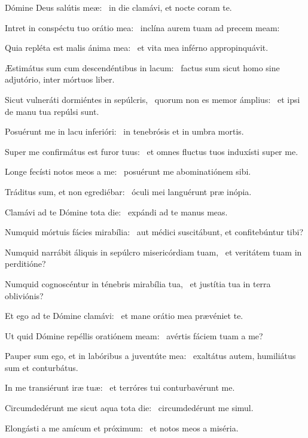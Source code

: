 \item Dómine Deus salútis meæ:~\psstar{} in die clamávi, et nocte coram te.

\item Intret in conspéctu tuo orátio mea:~\psstar{} inclína aurem tuam ad precem meam:

\item Quia repléta est malis ánima mea:~\psstar{} et vita mea inférno appropinquávit.

\item Æstimátus sum cum descendéntibus in lacum:~\psstar{} factus sum sicut homo sine adjutório, inter mórtuos liber.

\item Sicut vulneráti dormiéntes in sepúlcris,~\pscross{} quorum non es memor ámplius:~\psstar{} et ipsi de manu tua repúlsi sunt.

\item Posuérunt me in lacu inferióri:~\psstar{} in tenebrósis et in umbra mortis.

\item Super me confirmátus est furor tuus:~\psstar{} et omnes fluctus tuos induxísti super me.

\item Longe fecísti notos meos a me:~\psstar{} posuérunt me abominatiónem sibi.

\item Tráditus sum, et non egrediébar:~\psstar{} óculi mei languérunt præ inópia.

\item Clamávi ad te Dómine tota die:~\psstar{} expándi ad te manus meas.

\item Numquid mórtuis fácies mirabília:~\psstar{} aut médici suscitábunt, et confitebúntur tibi?

\item Numquid narrábit áliquis in sepúlcro misericórdiam tuam,~\psstar{} et veritátem tuam in perditióne?

\item Numquid cognoscéntur in ténebris mirabília tua,~\psstar{} et justítia tua in terra obliviónis?

\item Et ego ad te Dómine clamávi:~\psstar{} et mane orátio mea prævéniet te.

\item Ut quid Dómine repéllis oratiónem meam:~\psstar{} avértis fáciem tuam a me?

\item Pauper sum ego, et in labóribus a juventúte mea:~\psstar{} exaltátus autem, humiliátus sum et conturbátus.

\item In me transiérunt iræ tuæ:~\psstar{} et terróres tui conturbavérunt me.

\item Circumdedérunt me sicut aqua tota die:~\psstar{} circumdedérunt me simul.

\item Elongásti a me amícum et próximum:~\psstar{} et notos meos a miséria.

